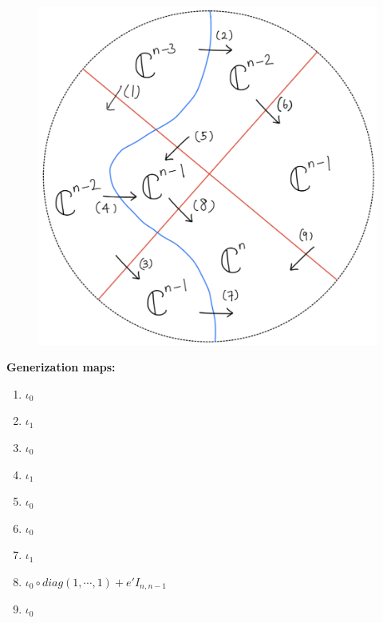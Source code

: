 \begin{figure}[H]
    \centering
    \includegraphics[scale = 0.45]{diagrams/cobord'4/33.png}
    \caption{}
    \label{fig:your-label}
\end{figure}
\textbf{Generization maps:}
\begin{enumerate}[label = (\arabic*)]
\item $\iota_0$

\item $\iota_1$

\item $\iota_0$

\item $\iota_1$

\item $\iota_0$

\item $\iota_0$

\item $\iota_1$

\item $\iota_0 \circ diag(1,\cdots,1) + e' I_{n,n-1}$

\item $\iota_0$
\end{enumerate}

